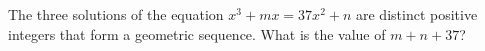 The three solutions of the equation $x^3+mx=37x^2+n$ are distinct positive integers that form a geometric sequence. What is the value of $m+n+37$?
